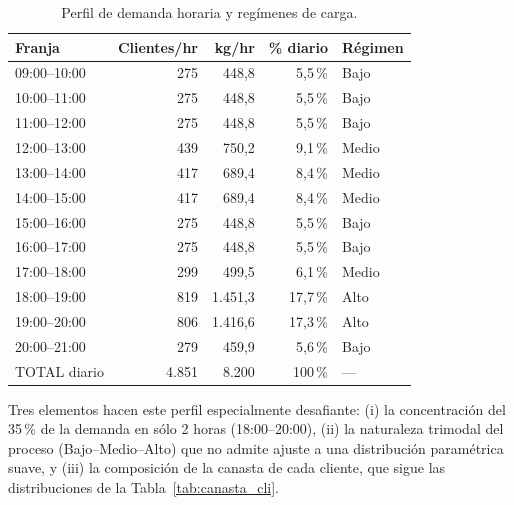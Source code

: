 \documentclass[10pt, a4paper]{article}
\begin{document}
\begin{table}[H]
\centering
\caption{Perfil de demanda horaria y reg\'imenes de carga.}
\label{tab:demanda_perfil}
\renewcommand{\arraystretch}{1.15}
\begin{tabular}{l r r r l}
\toprule
\rowcolor{azulClaro}
\textbf{Franja} & \textbf{Clientes/hr} & \textbf{kg/hr} & \textbf{\% diario} & \textbf{R\'egimen} \\
\midrule
09:00--10:00 & 275   & 448{,}8   & 5{,}5\,\%  & Bajo  \\
\rowcolor{grisClaro}
10:00--11:00 & 275   & 448{,}8   & 5{,}5\,\%  & Bajo  \\
11:00--12:00 & 275   & 448{,}8   & 5{,}5\,\%  & Bajo  \\
\rowcolor{grisClaro}
12:00--13:00 & 439   & 750{,}2   & 9{,}1\,\%  & Medio \\
13:00--14:00 & 417   & 689{,}4   & 8{,}4\,\%  & Medio \\
\rowcolor{grisClaro}
14:00--15:00 & 417   & 689{,}4   & 8{,}4\,\%  & Medio \\
15:00--16:00 & 275   & 448{,}8   & 5{,}5\,\%  & Bajo  \\
\rowcolor{grisClaro}
16:00--17:00 & 275   & 448{,}8   & 5{,}5\,\%  & Bajo  \\
17:00--18:00 & 299   & 499{,}5   & 6{,}1\,\%  & Medio \\
\rowcolor{rojoAlerta!12}
18:00--19:00 & 819   & 1.451{,}3 & 17{,}7\,\% & \textcolor{rojoAlerta}{Alto}  \\
\rowcolor{rojoAlerta!12}
19:00--20:00 & 806   & 1.416{,}6 & 17{,}3\,\% & \textcolor{rojoAlerta}{Alto}  \\
20:00--21:00 & 279   & 459{,}9   & 5{,}6\,\%  & Bajo  \\
\midrule
\rowcolor{azulClaro}
TOTAL diario & 4.851 & 8.200     & 100\,\%    & ---   \\
\bottomrule
\end{tabular}
\end{table}

Tres elementos hacen este perfil especialmente desafiante: (i) la concentraci\'on
del 35\,\% de la demanda en s\'olo 2 horas (18:00--20:00), (ii) la naturaleza
trimodal del proceso (Bajo--Medio--Alto) que no admite ajuste a una
distribuci\'on param\'etrica suave, y (iii) la composici\'on de la canasta de
cada cliente, que sigue las distribuciones de la Tabla~\ref{tab:canasta_cli}.
\end{document}
